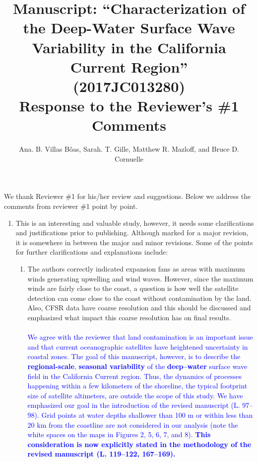 \documentclass{article}
\title{
Manuscript: ``Characterization of the Deep-Water Surface Wave Variability 
in the California Current Region'' 
\\ (2017JC013280) \\ \vspace{.5cm}Response to the Reviewer's \#1 Comments}
\author{Ana. B. Villas B\^oas, Sarah. T. Gille, Matthew R. Mazloff, and  Bruce D. Cornuelle}
\begin{document}
\maketitle

{\color{blue}
We thank Reviewer \#1 for his/her review and suggestions. Below we address the comments from reviewer \#1 point by point.
}

\begin{enumerate}
\item
This is an interesting and valuable study, however, it needs some clarifications and justifications prior to publishing. Although marked for a major revision, it is somewhere in between the major and minor revisions.  
Some of the points for further clarifications and explanations include:

\begin{enumerate}
\item{
The authors correctly indicated expansion fans as areas with maximum winds generating upwelling and wind waves. However, since the maximum winds are fairly close to the coast, a question is how well the satellite detection can come close to the coast without contamination by the land. Also, CFSR data have coarse resolution and this should be discussed and emphasized what impact this coarse resolution has on final results.} 
\\\\
\indent \textcolor{blue}{ We agree with the reviewer that land contamination is an important issue and that current oceanographic satellites have heightened uncertainty in coastal zones. 
The goal of this manuscript, however, is to describe the \textbf{regional-scale}, \textbf{seasonal variability} of the \textbf{deep--water} surface wave field in the California Current region. Thus, the dynamics of processes happening within a few kilometers of the shoreline, the typical footprint size of satellite altimeters, are outside the scope of this study. We have emphasized our goal in the introduction of the revised manuscript (L. 97--98). Grid points at water depths shallower than 100 m or within less than 20 km from the coastline are not considered in our analysis (note the white spaces on the maps in Figures 2, 5, 6, 7, and 8). \textbf{This consideration is now explicitly stated in the methodology of the revised manuscript (L. 119--122, 167--169).}}
\\\\

\end{enumerate}
\end{enumerate}
\end{document}
